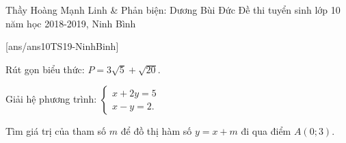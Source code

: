 \begin{name}
	{Thầy Hoàng Mạnh Linh \& Phản biện: Dương Bùi Đức}
	{Đề thi tuyển sinh lớp 10 năm học 2018-2019, Ninh Bình}
\end{name}
\setcounter{ex}{0}
[ans/ans10TS19-NinhBinh]

\begin{ex}%
Rút gọn biểu thức: $P = 3\sqrt{5} + \sqrt{20}$.
\end{ex}

\begin{ex}%
Giải hệ phương trình: $\begin{cases}
	x + 2y = 5\\
	x - y = 2.
	\end{cases}$
\end{ex}



\begin{ex}%
Tìm giá trị của tham số $m$ để đồ thị hàm số $y = x + m$ đi qua điểm $A (0;3)$.
\end{ex}

